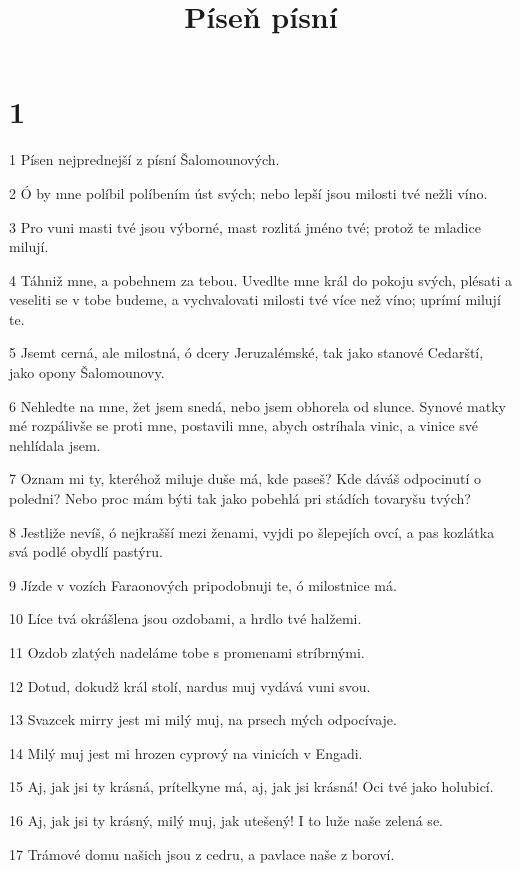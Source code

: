 

\title{Píseň písní}

\chapter{1}

\par 1 Písen nejprednejší z písní Šalomounových.
\par 2 Ó by mne políbil políbením úst svých; nebo lepší jsou milosti tvé nežli víno.
\par 3 Pro vuni masti tvé jsou výborné, mast rozlitá jméno tvé; protož te mladice milují.
\par 4 Táhniž mne, a pobehnem za tebou. Uvedlte mne král do pokoju svých, plésati a veseliti se v tobe budeme, a vychvalovati milosti tvé více než víno; uprímí milují te.
\par 5 Jsemt cerná, ale milostná, ó dcery Jeruzalémské, tak jako stanové Cedarští, jako opony Šalomounovy.
\par 6 Nehledte na mne, žet jsem snedá, nebo jsem obhorela od slunce. Synové matky mé rozpálivše se proti mne, postavili mne, abych ostríhala vinic, a vinice své nehlídala jsem.
\par 7 Oznam mi ty, kteréhož miluje duše má, kde paseš? Kde dáváš odpocinutí o poledni? Nebo proc mám býti tak jako pobehlá pri stádích tovaryšu tvých?
\par 8 Jestliže nevíš, ó nejkrašší mezi ženami, vyjdi po šlepejích ovcí, a pas kozlátka svá podlé obydlí pastýru.
\par 9 Jízde v vozích Faraonových pripodobnuji te, ó milostnice má.
\par 10 Líce tvá okrášlena jsou ozdobami, a hrdlo tvé halžemi.
\par 11 Ozdob zlatých nadeláme tobe s promenami stríbrnými.
\par 12 Dotud, dokudž král stolí, nardus muj vydává vuni svou.
\par 13 Svazcek mirry jest mi milý muj, na prsech mých odpocívaje.
\par 14 Milý muj jest mi hrozen cyprový na vinicích v Engadi.
\par 15 Aj, jak jsi ty krásná, prítelkyne má, aj, jak jsi krásná! Oci tvé jako holubicí.
\par 16 Aj, jak jsi ty krásný, milý muj, jak utešený! I to luže naše zelená se.
\par 17 Trámové domu našich jsou z cedru, a pavlace naše z boroví.

